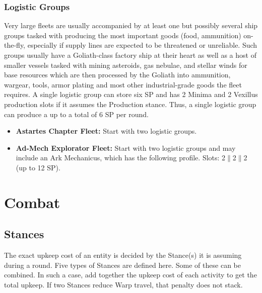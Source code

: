 \subsection{Logistic Groups}
Very large fleets are usually accompanied by at least one but possibly several ship groups tasked with producing the most important goods (food, ammunition) on-the-fly, especially if supply lines are expected to be threatened or unreliable. 
Such groups usually have a Goliath-class factory ship at their heart as well as a host of smaller vessels tasked with mining asteroids, gas nebulae, and stellar winds for base resources which are then processed by the Goliath into ammunition, wargear, tools, armor plating and most other industrial-grade goods the fleet requires. \newline
A single logistic group can store six SP and has 2 Minima and 2 Vexillus production slots if it assumes the Production stance. Thus, a single logistic group can produce a up to a total of 6 SP per round.
\begin{itemize}
	\item \textbf{Astartes Chapter Fleet:} Start with two logistic groups.
	\item \textbf{Ad-Mech Explorator Fleet:} Start with two logistic groups and may include an Ark Mechanicus, which has the following profile. Slots: 2$\|$2$\|$2 (up to 12 SP).
\end{itemize}

\chapter{Combat}
\section{Stances} \label{stances}
The exact upkeep cost of an entity is decided by the Stance(s) it is assuming during a round. Five types of Stances are defined here. Some of these can be combined. In such a case, add together the upkeep cost of each activity to get the total upkeep. If two Stances reduce Warp travel, that penalty does not stack.

